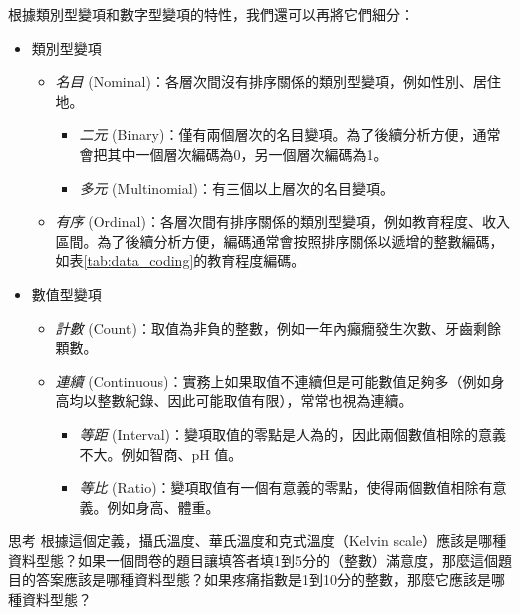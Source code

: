     根據類別型變項和數字型變項的特性，我們還可以再將它們細分：

    \begin{itemize}
        \item 類別型變項
        \begin{itemize}
            \item \textit{名目} (Nominal)：各層次間沒有排序關係的類別型變項，例如性別、居住地。
            \begin{itemize}
                \item \textit{二元} (Binary)：僅有兩個層次的名目變項。為了後續分析方便，通常會把其中一個層次編碼為0，另一個層次編碼為1。
                \item \textit{多元} (Multinomial)：有三個以上層次的名目變項。
            \end{itemize}
            \item \textit{有序} (Ordinal)：各層次間有排序關係的類別型變項，例如教育程度、收入區間。為了後續分析方便，編碼通常會按照排序關係以遞增的整數編碼，如表\ref{tab:data_coding}的教育程度編碼。
        \end{itemize}
        \item 數值型變項
        \begin{itemize}
            \item \textit{計數} (Count)：取值為非負的整數，例如一年內癲癇發生次數、牙齒剩餘顆數。
            \item \textit{連續} (Continuous)：實務上如果取值不連續但是可能數值足夠多（例如身高均以整數紀錄、因此可能取值有限），常常也視為連續。
            \begin{itemize}
                \item \textit{等距} (Interval)：變項取值的零點是人為的，因此兩個數值相除的意義不大。例如智商、pH 值。
                \item \textit{等比} (Ratio)：變項取值有一個有意義的零點，使得兩個數值相除有意義。例如身高、體重。
            \end{itemize}
        \end{itemize}
    \end{itemize}

    \begin{custom}{思考}
        根據這個定義，攝氏溫度、華氏溫度和克式溫度（Kelvin scale）應該是哪種資料型態？如果一個問卷的題目讓填答者填1到5分的（整數）滿意度，那麼這個題目的答案應該是哪種資料型態？如果疼痛指數是1到10分的整數，那麼它應該是哪種資料型態？
    \end{custom}

